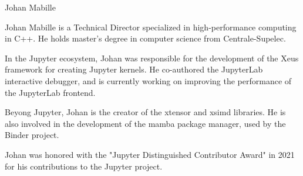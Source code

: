 \begin{participant}[type=R,PM=0,gender=male]{Johan Mabille}


  Johan Mabille is a Technical Director specialized in high-performance computing in C++. He holds master's degree in computer science from Centrale-Supelec.

  In the Jupyter ecosystem, Johan was responsible for the development of the Xeus framework for creating Jupyter kernels. He co-authored the JupyterLab interactive debugger, and is currently
  working on improving the performance of the JupyterLab frontend.

  Beyong Jupyter, Johan is the creator of the xtensor and xsimd libraries. He is also involved in the development of the mamba package manager, used by the Binder project.

  Johan was honored with the "Jupyter Distinguished Contributor Award" in 2021 for his contributions to the Jupyter project.
\end{participant}

